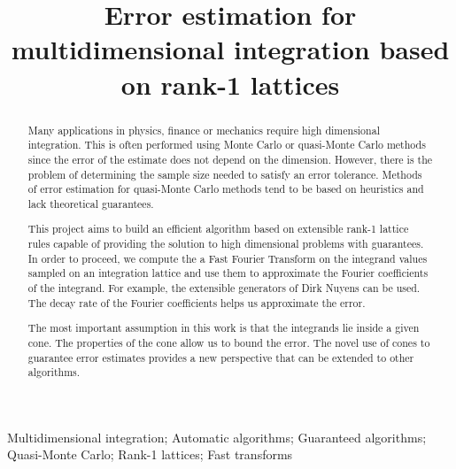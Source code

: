\documentclass[]{elsarticle}
\theoremstyle{definition}
\begin{document}
\begin{frontmatter}

\title{Error estimation for multidimensional integration based on rank-1 lattices}
\begin{abstract} 

Many applications in physics, finance or mechanics require high dimensional integration. This is often performed using Monte Carlo or quasi-Monte Carlo methods since the error of the estimate does not depend on the dimension. However, there is the problem of determining the sample size needed to satisfy an error tolerance. Methods of error estimation for quasi-Monte Carlo methods tend to be based on heuristics and lack theoretical guarantees.

This project aims to build an efficient algorithm based on extensible rank-1 lattice rules \cite{HicNie03a} capable of providing the solution to high dimensional problems with guarantees. In order to proceed, we compute the a Fast Fourier Transform on the integrand values sampled on an integration lattice and use them to approximate the Fourier coefficients of the integrand.  For example, the extensible generators of Dirk Nuyens \cite{dirknuyens} can be used. The decay rate of the Fourier coefficients helps us approximate the error.

The most important assumption in this work is that the integrands lie inside a given cone. The properties of the cone allow us to bound the error. The novel use of cones to guarantee error estimates provides a new perspective that can be extended to other algorithms.

\end{abstract}

\begin{keyword}
Multidimensional integration; Automatic algorithms; Guaranteed algorithms; Quasi-Monte Carlo; Rank-1 lattices; Fast transforms

\end{keyword}
\end{frontmatter}


%

\end{document}
